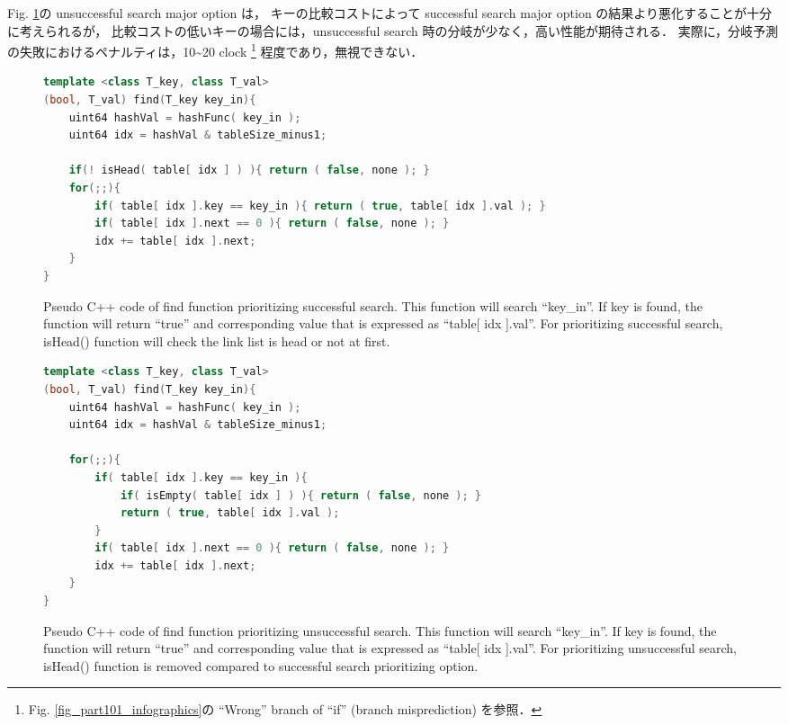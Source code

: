 Fig. \ref{alg_find_usm}の unsuccessful search major option は，
キーの比較コストによって successful search major option の結果より悪化することが十分に考えられるが，
比較コストの低いキーの場合には，unsuccessful search 時の分岐が少なく，高い性能が期待される．
実際に，分岐予測の失敗におけるペナルティは，10\textasciitilde 20 clock \footnote
{
  Fig. \ref{fig_part101_infographics}の ``Wrong'' branch of ``if'' (branch misprediction) を参照．
}
程度であり，無視できない．

\begin{figure}%
\begin{lstlisting}[language=C++]
template <class T_key, class T_val>
(bool, T_val) find(T_key key_in){
	uint64 hashVal = hashFunc( key_in );
	uint64 idx = hashVal & tableSize_minus1;
	
	if(! isHead( table[ idx ] ) ){ return ( false, none ); }
	for(;;){
		if( table[ idx ].key == key_in ){ return ( true, table[ idx ].val ); }
		if( table[ idx ].next == 0 ){ return ( false, none ); }
		idx += table[ idx ].next;
	}
}
\end{lstlisting}
\caption{
  Pseudo C++ code of find function prioritizing successful search.
  This function will search ``key\_in''.
  If key is found, the function will return ``true'' and corresponding value that is expressed as ``table[ idx ].val''.
  For prioritizing successful search, isHead() function will check the link list is head or not at first.
}
\label{alg_find_sm}
\begin{lstlisting}[language=C++]
template <class T_key, class T_val>
(bool, T_val) find(T_key key_in){
	uint64 hashVal = hashFunc( key_in );
	uint64 idx = hashVal & tableSize_minus1;
	
	for(;;){
		if( table[ idx ].key == key_in ){
			if( isEmpty( table[ idx ] ) ){ return ( false, none ); }
			return ( true, table[ idx ].val );
		}
		if( table[ idx ].next == 0 ){ return ( false, none ); }
		idx += table[ idx ].next;
	}
}
\end{lstlisting}
\caption{
  Pseudo C++ code of find function prioritizing unsuccessful search.
  This function will search ``key\_in''.
  If key is found, the function will return ``true'' and corresponding value that is expressed as ``table[ idx ].val''.
  For prioritizing unsuccessful search, isHead() function is removed compared to successful search prioritizing option.
}
\label{alg_find_usm}
\end{figure}

